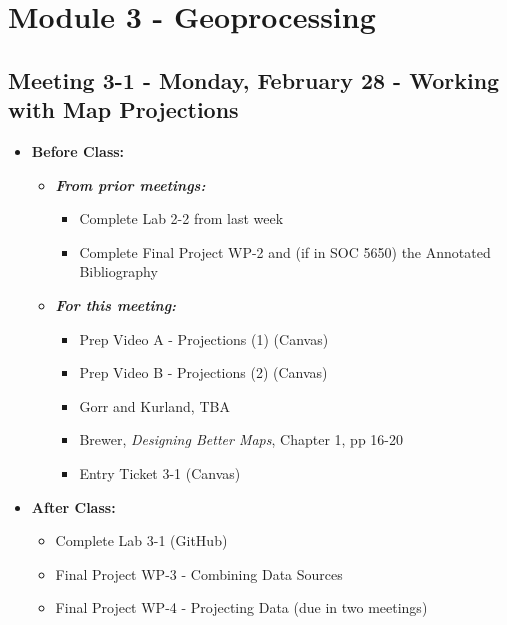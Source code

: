 \documentclass[
]{book}
\providecommand{\tightlist}{%
  \setlength{\itemsep}{0pt}\setlength{\parskip}{0pt}}
\begin{document}
\hypertarget{module-3---geoprocessing}{%
\section*{Module 3 - Geoprocessing}\label{module-3---geoprocessing}}

\hypertarget{meeting-3-1---monday-february-28---working-with-map-projections}{%
\subsection*{Meeting 3-1 - Monday, February 28 - Working with Map Projections}\label{meeting-3-1---monday-february-28---working-with-map-projections}}

\begin{itemize}
\tightlist
\item
  \textbf{Before Class:}

  \begin{itemize}
  \tightlist
  \item
    \textbf{\emph{From prior meetings:}}

    \begin{itemize}
    \tightlist
    \item
      Complete Lab 2-2 from last week
    \item
      Complete Final Project WP-2 and (if in SOC 5650) the Annotated Bibliography
    \end{itemize}
  \item
    \textbf{\emph{For this meeting:}}

    \begin{itemize}
    \tightlist
    \item
      Prep Video A - Projections (1) (Canvas)
    \item
      Prep Video B - Projections (2) (Canvas)
    \item
      Gorr and Kurland, TBA
    \item
      Brewer, \emph{Designing Better Maps}, Chapter 1, pp 16-20
    \item
      Entry Ticket 3-1 (Canvas)
    \end{itemize}
  \end{itemize}
\item
  \textbf{After Class:}

  \begin{itemize}
  \tightlist
  \item
    Complete Lab 3-1 (GitHub)
  \item
    Final Project WP-3 - Combining Data Sources
  \item
    Final Project WP-4 - Projecting Data (due in two meetings)
  \end{itemize}
\end{itemize}
\end{document}
